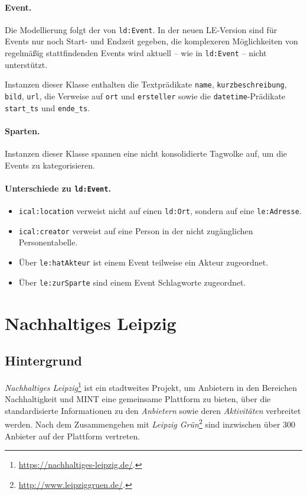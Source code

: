 \documentclass[a4paper,11pt]{article}
\begin{document}
\paragraph{Event.}
Die Modellierung folgt der von \texttt{ld:Event}. In der neuen LE-Version sind
für Events nur noch Start- und Endzeit gegeben, die komplexeren Möglichkeiten
von regelmäßig stattfindenden Events wird aktuell -- wie in \texttt{ld:Event}
-- nicht unterstützt.

Instanzen dieser Klasse enthalten die Textprädikate \texttt{name},
\texttt{kurzbeschreibung}, \texttt{bild}, \texttt{url}, die Verweise auf
\texttt{ort} und \texttt{ersteller} sowie die \texttt{datetime}-Prädikate
\texttt{start\_ts} und \texttt{ende\_ts}. 

\paragraph{Sparten.}
Instanzen dieser Klasse spannen eine nicht konsolidierte Tagwolke auf, um die
Events zu kategorisieren.

\paragraph{Unterschiede zu \texttt{ld:Event}.}
\begin{itemize}\itemsep0pt
\item \texttt{ical:location} verweist nicht auf einen \texttt{ld:Ort}, sondern
  auf eine \texttt{le:Adresse}.
\item \texttt{ical:creator} verweist auf eine Person in der nicht zugänglichen
  Personentabelle.
\item Über \texttt{le:hatAkteur} ist einem Event teilweise ein Akteur zugeordnet.
\item Über \texttt{le:zurSparte} sind einem Event Schlagworte zugeordnet.
\end{itemize}
\newpage

\section{Nachhaltiges Leipzig}

\subsection{Hintergrund}

\emph{Nachhaltiges Leipzig}\footnote{\url{https://nachhaltiges-leipzig.de/}.}
ist ein stadtweites Projekt, um Anbietern in den Bereichen Nachhaltigkeit und
MINT eine gemeinsame Plattform zu bieten, über die standardisierte
Informationen zu den \emph{Anbietern} sowie deren \emph{Aktivitäten}
verbreitet werden.  Nach dem Zusammengehen mit \emph{Leipzig
  Grün}\footnote{\url{http://www.leipziggruen.de/}.} sind inzwischen über 300
Anbieter auf der Plattform vertreten. 
\end{document}
